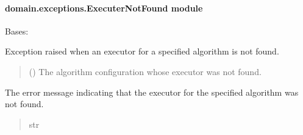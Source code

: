 \documentclass[letterpaper,10pt,english]{sphinxmanual}
\begin{document}
\paragraph{domain.exceptions.ExecuterNotFound module}
\label{\detokenize{domain.exceptions:module-domain.exceptions.ExecuterNotFound}}\label{\detokenize{domain.exceptions:domain-exceptions-executernotfound-module}}

\begin{fulllineitems}
\label{\detokenize{domain.exceptions:domain.exceptions.ExecuterNotFound.ExecuterNotFound}}
\pysigstartsignatures
{}
\pysigstopsignatures
\sphinxAtStartPar
Bases: 

\sphinxAtStartPar
Exception raised when an executor for a specified algorithm is not found.
\begin{quote}\begin{description}
\sphinxAtStartPar
{} ({\hyperref[\detokenize{domain.interfaces:domain.interfaces.AlgorithmConfigurator.AlgorithmConfigurator}]{}}) \textendash{} The algorithm configuration whose executor was not found.

\end{description}\end{quote}

\begin{fulllineitems}
\label{\detokenize{domain.exceptions:domain.exceptions.ExecuterNotFound.ExecuterNotFound.message}}
\pysigstartsignatures
{}
\pysigstopsignatures
\sphinxAtStartPar
The error message indicating that the executor for the specified algorithm was not found.
\begin{quote}\begin{description}
\sphinxAtStartPar
str

\end{description}\end{quote}

\end{fulllineitems}


\end{fulllineitems}
\end{document}
